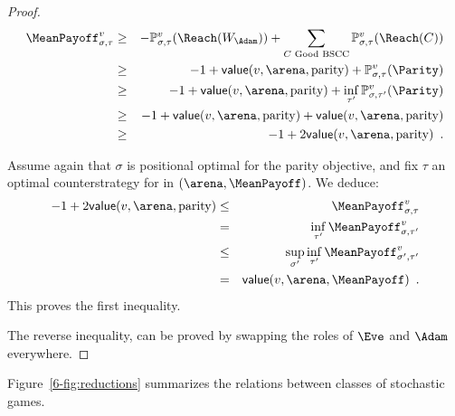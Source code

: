 \begin{proof}
\begin{eqnarray*}
    \MeanPayoff_{\sigma,\tau}^{v} & \geq & - \probm_{\sigma,\tau}^v(\Reach(W_\Adam)) + \sum_{C \textrm{ Good BSCC}} \probm_{\sigma,\tau}^v(\Reach(C))\\
                                  & \geq & -1 + \mathsf{value}(v,\arena,\textrm{parity}) + \probm_{\sigma,\tau}^v(\Parity)\\
                                  & \geq & -1 + \mathsf{value}(v,\arena,\textrm{parity}) + \inf_{\tau'} \probm_{\sigma,\tau'}^v(\Parity)\\
                                  & \geq & -1 + \mathsf{value}(v,\arena,\textrm{parity}) + \mathsf{value}(v,\arena,\textrm{parity})\\
                                  &  \geq & -1 + 2  \mathsf{value}(v,\arena,\textrm{parity}) \enspace.
\end{eqnarray*}

Assume again that $\sigma$ is positional optimal for the parity objective, and fix $\tau$ an optimal counterstrategy for \Adam in $(\arena,\MeanPayoff)$. We deduce:
\begin{eqnarray*}
    -1 + 2 \mathsf{value}(v,\arena,\textrm{parity}) & \leq & 
                                                             \MeanPayoff_{\sigma,\tau}^{v}\\
                                                    & = & \inf_{\tau'}
                                                          \MeanPayoff_{\sigma,\tau'}^{v}\\
                                                    & \leq &
                                                              \sup_{\sigma'}\inf_{\tau'}
                                                             \MeanPayoff_{\sigma',\tau'}^{v}\\
                                                    & = & 
                                                          \mathsf{value}(v,\arena,\MeanPayoff) \enspace.
\end{eqnarray*} 
This proves the first inequality.

The reverse inequality, can be proved by swapping the roles of $\Eve$ and $\Adam$ everywhere.
\end{proof}

Figure~\cref{6-fig:reductions} summarizes the relations between classes
of stochastic games.
